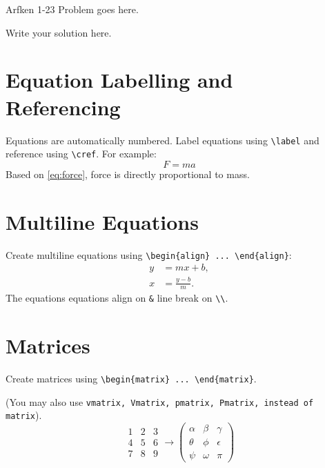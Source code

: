 
\begin{problem}{Arfken 1-23}
    Problem goes here.
\end{problem}

\begin{solution}
    Write your solution here.

    \section{Equation Labelling and Referencing}
    Equations are automatically numbered. Label equations using \verb|\label| and reference using \verb|\cref|. For example:
    \begin{equation} \label{eq:force}
        F = ma
    \end{equation}
    Based on \cref{eq:force}, force is directly proportional to mass.

    \section{Multiline Equations}
    Create multiline equations using \verb|\begin{align} ... \end{align}|:
    \begin{align}
        y &= mx + b, \\ 
        x &= \frac{y-b}{m}.
    \end{align}
    The equations equations align on \verb|&| line break on \verb|\\|.

    \section{Matrices}
    Create matrices using \verb|\begin{matrix} ... \end{matrix}|. 
    
    (You may also use \texttt{vmatrix, Vmatrix, pmatrix, Pmatrix, instead of matrix}).
    \begin{equation}
    \begin{matrix}
        1 & 2 & 3 \\
        4 & 5 & 6 \\
        7 & 8 & 9
    \end{matrix}
    \to
    \begin{pmatrix}
        \alpha & \beta & \gamma \\
        \theta & \phi & \epsilon \\
        \psi & \omega & \pi
    \end{pmatrix}
    \end{equation}
\end{solution}
